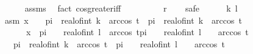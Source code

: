 \begin{isabellebody}
\ \ \ \ \isamarkupfalse%
\ assms\ \isamarkupfalse%
\ {\isacharparenleft}{\kern0pt}fact\ cos{\isacharunderscore}{\kern0pt}greater{\isacharunderscore}{\kern0pt}iff{\isacharparenright}{\kern0pt}\isanewline
\ \ \isamarkupfalse%
\ \isamarkupfalse%
\ {\isachardoublequoteopen}{\isasymdots}\ {\isacharequal}{\kern0pt}\ {\isacharparenleft}{\kern0pt}{\isasymnot}\ {\isacharparenleft}{\kern0pt}\ {\isacharquery}{\kern0pt}r{\isacharparenright}{\kern0pt}{\isacharparenright}{\kern0pt}{\isachardoublequoteclose}\isanewline
\ \ \isamarkupfalse%
\ {\isacharparenleft}{\kern0pt}safe{\isacharparenright}{\kern0pt}\isanewline
\ \ \ \ \isamarkupfalse%
\ k\ l\ \isamarkupfalse%
\ asm{\isacharcolon}{\kern0pt}\ {\isachardoublequoteopen}x\ {\isasymin}\ {\isacharbraceleft}{\kern0pt}{}\ {\isacharasterisk}{\kern0pt}\ pi\ {\isacharasterisk}{\kern0pt}\ real{\isacharunderscore}{\kern0pt}of{\isacharunderscore}{\kern0pt}int\ k\ {\isacharminus}{\kern0pt}\ arccos\ t{\isacharless}{\kern0pt}{\isachardot}{\kern0pt}{\isachardot}{\kern0pt}{\isacharless}{\kern0pt}{}\ {\isacharasterisk}{\kern0pt}\ pi\ {\isacharasterisk}{\kern0pt}\ real{\isacharunderscore}{\kern0pt}of{\isacharunderscore}{\kern0pt}int\ k\ {\isacharplus}{\kern0pt}\ arccos\ t{\isacharbraceright}{\kern0pt}{\isachardoublequoteclose}\isanewline
\ \ \ \ \ \ {\isachardoublequoteopen}x\ {\isasymin}\ {\isacharbraceleft}{\kern0pt}pi\ {\isacharasterisk}{\kern0pt}\ {\isacharparenleft}{\kern0pt}{}\ {\isacharasterisk}{\kern0pt}\ real{\isacharunderscore}{\kern0pt}of{\isacharunderscore}{\kern0pt}int\ l{\isacharparenright}{\kern0pt}\ {\isacharplus}{\kern0pt}\ arccos\ t{\isachardot}{\kern0pt}{\isachardot}{\kern0pt}pi\ {\isacharasterisk}{\kern0pt}\ {\isacharparenleft}{\kern0pt}{}\ {\isacharasterisk}{\kern0pt}\ {\isacharparenleft}{\kern0pt}real{\isacharunderscore}{\kern0pt}of{\isacharunderscore}{\kern0pt}int\ l\ {\isacharplus}{\kern0pt}\ {}{\isacharparenright}{\kern0pt}{\isacharparenright}{\kern0pt}\ {\isacharminus}{\kern0pt}\ arccos\ t{\isacharbraceright}{\kern0pt}{\isachardoublequoteclose}\isanewline
\ \ \ \ \isamarkupfalse%
\ {\isachardoublequoteopen}{}\ {\isacharasterisk}{\kern0pt}\ pi\ {\isacharasterisk}{\kern0pt}\ real{\isacharunderscore}{\kern0pt}of{\isacharunderscore}{\kern0pt}int\ k\ {\isacharminus}{\kern0pt}\ arccos\ t\ {\isacharless}{\kern0pt}\ pi\ {\isacharasterisk}{\kern0pt}\ {\isacharparenleft}{\kern0pt}{}\ {\isacharasterisk}{\kern0pt}\ {\isacharparenleft}{\kern0pt}real{\isacharunderscore}{\kern0pt}of{\isacharunderscore}{\kern0pt}int\ l\ {\isacharplus}{\kern0pt}\ {}{\isacharparenright}{\kern0pt}{\isacharparenright}{\kern0pt}\ {\isacharminus}{\kern0pt}\ arccos\ t{\isachardoublequoteclose}\ \isamarkupfalse%

\end{isabellebody}
